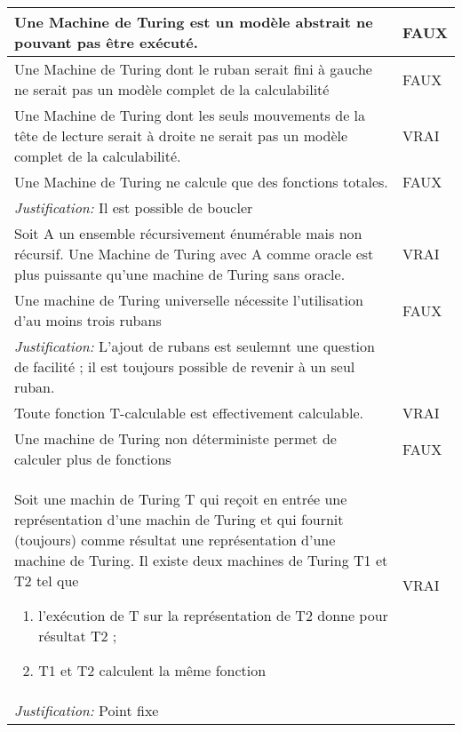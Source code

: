 \begin{longtable}{p{13cm}|l}
    Une Machine de Turing est un modèle abstrait ne pouvant pas être exécuté.& FAUX \\
     \hline
    Une Machine de Turing dont le ruban serait fini à gauche ne serait pas un modèle complet de la calculabilité & FAUX \\
     \hline
    Une Machine de Turing dont les seuls mouvements de la tête de lecture serait à droite ne serait pas un modèle complet de la calculabilité. & VRAI \\
     \hline
    Une Machine de Turing ne calcule que des fonctions totales. & FAUX \\
    \textit{Justification:} Il est possible de boucler & \\
     \hline
    Soit A un ensemble récursivement énumérable mais non récursif. Une Machine de Turing avec A comme oracle est plus puissante qu'une machine de Turing sans oracle. & VRAI \\
     \hline
    Une machine de Turing universelle nécessite l'utilisation d'au moins trois rubans & FAUX \\
    \textit{Justification:} L'ajout de rubans est seulemnt une question de facilité ; il est toujours possible de revenir à un seul ruban. & \\
     \hline
    Toute fonction T-calculable est effectivement calculable. & VRAI \\
     \hline
    Une machine de Turing non déterministe permet de calculer plus de fonctions & FAUX \\
     \hline
    Soit une machin de Turing T qui reçoit en entrée une représentation d'une machin de Turing et qui fournit (toujours) comme résultat une représentation d'une machine de Turing. Il existe deux machines de Turing T1 et T2 tel que \begin{enumerate}
    \item l'exécution de T sur la représentation de T2 donne pour résultat T2 ;
    \item T1 et T2 calculent la même fonction
   \end{enumerate}
   & VRAI \\
    \textit{Justification:} Point fixe & \\

\end{longtable}
